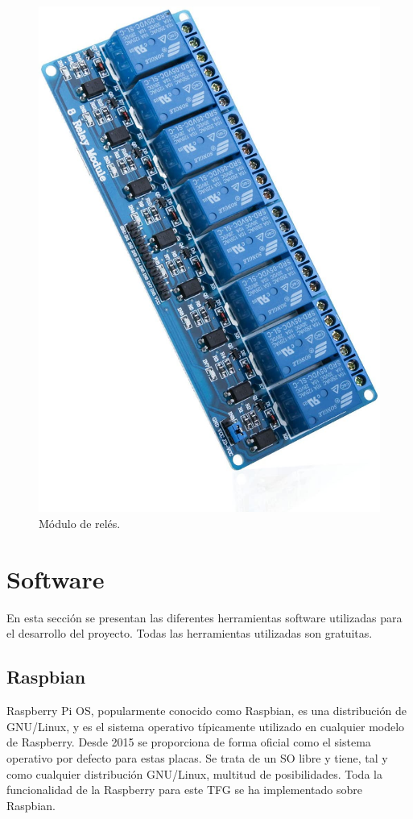 \documentclass[a4paper, 12pt, oneside]{book}
\begin{document}
\begin{figure}[H]
\begin{minipage}[b]{0.4\textwidth}
    \includegraphics[width=\textwidth]{img/reles}
    \caption{Módulo de relés.}
    \label{figura:reles}
  \end{minipage}
\end{figure}
 

\section{Software}
\label{software}
En esta sección se presentan las diferentes herramientas software utilizadas para el desarrollo del proyecto. Todas las herramientas utilizadas son gratuitas.

\subsection{Raspbian}
\label{subsec:raspbian}
Raspberry Pi OS, popularmente conocido como Raspbian, es una distribución de GNU/Linux, y es el sistema operativo típicamente utilizado en cualquier modelo de Raspberry. Desde 2015 se proporciona de forma oficial como el sistema operativo por defecto para estas placas.
Se trata de un SO libre y tiene, tal y como cualquier distribución GNU/Linux, multitud de posibilidades.
Toda la funcionalidad de la Raspberry para este TFG se ha implementado sobre Raspbian.
\end{document}
